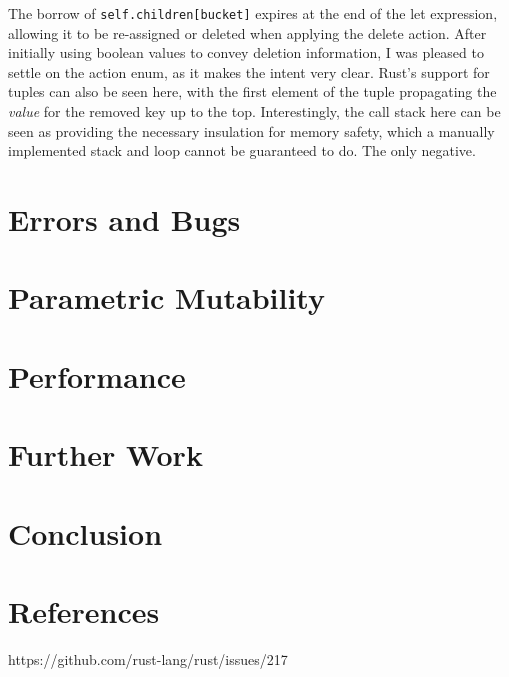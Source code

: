 \documentclass[a4paper,12pt]{article}
\newcommand{\code}{\texttt}
\begin{document}
The borrow of \code{self.children[bucket]} expires at the end of the let expression, allowing it to be re-assigned or deleted when applying the delete action. After initially using boolean values to convey deletion information, I was pleased to settle on the action enum, as it makes the intent very clear. Rust's support for tuples can also be seen here, with the first element of the tuple propagating the \textit{value} for the removed key up to the top. Interestingly, the call stack here can be seen as providing the necessary insulation for memory safety, which a manually implemented stack and loop cannot be guaranteed to do. The only negative.

\section{Errors and Bugs}

\section{Parametric Mutability}

\section{Performance}

\section{Further Work}

\section{Conclusion}

\section{References}

https://github.com/rust-lang/rust/issues/217
\end{document}
